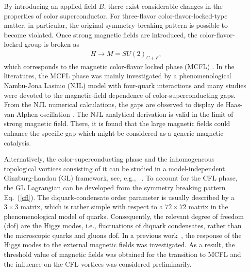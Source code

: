 \documentclass[prd, showpacs,nofootinbib,amsmath,amssymb]{revtex4}
\begin{document}
By introducing an applied field $B$, there exist considerable changes in the properties of color
superconductor. For three-flavor color-flavor-locked-type matter, in particular, the original symmetry
breaking pattern is possible to become violated. Once strong magnetic fields are introduced, the
color-flavor-locked group is broken as
\begin{eqnarray}
H\rightarrow M=SU(2)_{C+F},\label{cfl2}\end{eqnarray}
which corresponds to the magnetic color-flavor locked phase
(MCFL) \cite{ferrer2005magnetic,fukushima2008color,ferrer2006color,ferrer2007magnetic}.
In the literatures, the MCFL phase was mainly investigated by a phenomenological Nambu-Jona Lasinio (NJL)
model with four-quark interactions and many studies were devoted to the magnetic-field dependence of
color-superconducting gaps.
From the NJL numerical calculations, the gaps are observed to display de Haas-van Alphen
oscillation \cite{ferrer2005magnetic,fukushima2008color}.
The NJL analytical derivation is valid in the limit of strong magnetic field. There, it is found that
the large magnetic fields could enhance the specific gap \cite{ferrer2006color,sen2015anisotropic} which
might be considered as a generic magnetic catalysis.

Alternatively, the color-superconducting phase and the inhomogeneous topological vortices consisting of it can be studied in a model-independent Ginzburg-Landau (GL) framework, see, e.g., ~\cite{giannakis2002ginzburg,iida2002superfluid,balachandran2006semisuperfluid,nakano2008non,eto2014vortices}.
To account for the CFL phase, the GL Lagrangian can be developed from the symmetry breaking pattern Eq.~(\ref{cfl}).
The diquark-condensate order parameter is usually described by a $3\times3$ matrix, which is rather simple with
respect to a $72 \times 72$ matrix in the phenomenological model of quarks. Consequently, the relevant degree
of freedom (dof) are the Higgs modes, i.e., fluctuations of diquark condensates, rather than the microscopic
quarks and gluons dof. In a previous work~\cite{zhang2015magnetic}, the response of the Higgs modes to the
external magnetic fields was investigated. As a result, the threshold value of magnetic fields was obtained
for the transition to MCFL and the influence on the CFL vortices was considered preliminarily.
\end{document}
